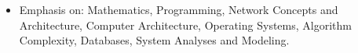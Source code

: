 \documentclass[10pt,a4paper]{altacv}
\begin{document}
\begin{itemize}
\justifying
\item Emphasis on: Mathematics, Programming, Network Concepts and Architecture, Computer Architecture, Operating Systems, Algorithm Complexity, Databases, System Analyses and Modeling.
\end{itemize}

\end{document}
